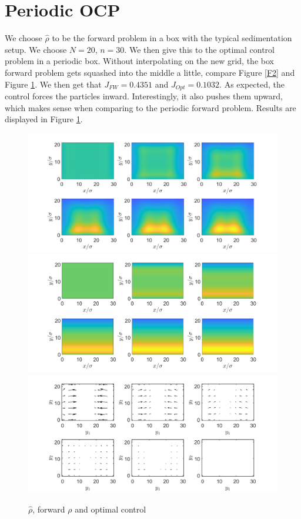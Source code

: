 \documentclass[11pt, a4paper]{article}
\theoremstyle{definition}
\newcommand{\hr}{\widehat \rho}
\begin{document}
\section{Periodic OCP}
We choose $\hr$ to be the forward problem in a box with the typical sedimentation setup. We choose $N = 20$, $n = 30$. We then give this to the optimal control problem in a periodic box. Without interpolating on the new grid, the box forward problem gets squashed into the middle a little, compare Figure \ref{F2} and Figure \ref{F4}.
We then get that $J_{FW} = 0.4351$ and $J_{Opt} = 0.1032$. As expected, the control forces the particles inward. Interestingly, it also pushes them upward, which makes sense when comparing to the periodic forward problem. Results are displayed in Figure \ref{F4}.
	\begin{figure}[h]
		\centering
		\includegraphics[scale=0.3]{rhoTarget.png}
		\includegraphics[scale=0.3]{rhoFWPeriodic.png}
		\includegraphics[scale=0.3]{Control.png}
		\caption{$\hr$, forward $\rho$ and optimal control} 
		\label{F4}
	\end{figure}
\end{document}

